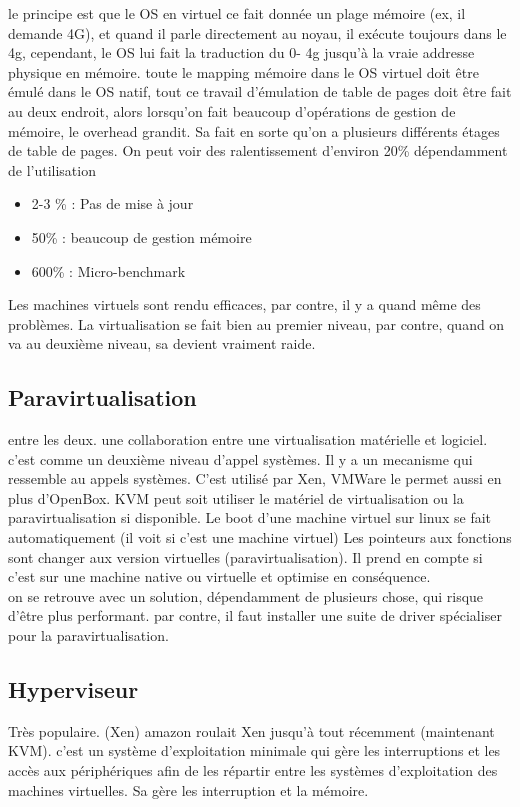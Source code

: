 \documentclass[oneside]{book}
\begin{document}
le principe est que le OS en virtuel ce fait donnée un plage mémoire (ex, il demande 4G), et quand il parle directement au noyau, il exécute toujours dans le 4g, cependant, le OS lui fait la traduction du 0- 4g jusqu'à la vraie addresse physique en mémoire. toute le mapping mémoire dans le OS virtuel doit être émulé dans le OS natif, tout ce travail d'émulation de table de pages doit être fait au deux endroit, alors lorsqu'on fait beaucoup d'opérations de gestion de mémoire, le overhead grandit. Sa fait en sorte qu'on a plusieurs différents étages de table de pages. On peut voir des ralentissement d'environ 20\% dépendamment de l'utilisation\\
\begin{itemize}
\item 2-3 \% : Pas de mise à jour
\item 50\% : beaucoup de gestion mémoire
\item 600\% : Micro-benchmark
\end{itemize}

Les machines virtuels sont rendu efficaces, par contre, il y a quand même des problèmes. La virtualisation se fait bien au premier niveau, par contre, quand on va au deuxième niveau, sa devient vraiment raide.\\

\subsection{Paravirtualisation}
entre les deux. une collaboration entre une virtualisation matérielle et logiciel. c'est comme un deuxième niveau d'appel systèmes. Il y a un mecanisme qui ressemble au appels systèmes. C'est utilisé par Xen, VMWare le permet aussi en plus d'OpenBox. KVM peut soit utiliser le matériel de virtualisation ou la paravirtualisation si disponible. Le boot d'une machine virtuel sur linux se fait automatiquement (il voit si c'est une machine virtuel) Les pointeurs aux fonctions sont changer aux version virtuelles (paravirtualisation). Il prend en compte si c'est sur une machine native ou virtuelle et optimise en conséquence.\\

on se retrouve avec un solution, dépendamment de plusieurs chose, qui risque d'être plus performant. par contre, il faut installer une suite de driver spécialiser pour la paravirtualisation.
\subsection{Hyperviseur}
Très populaire. (Xen) amazon roulait Xen jusqu'à tout récemment (maintenant KVM). c'est un système d'exploitation minimale qui gère les interruptions et les accès aux périphériques afin de les répartir entre les systèmes d'exploitation des machines virtuelles. Sa gère les interruption et la mémoire.\\
\end{document}
